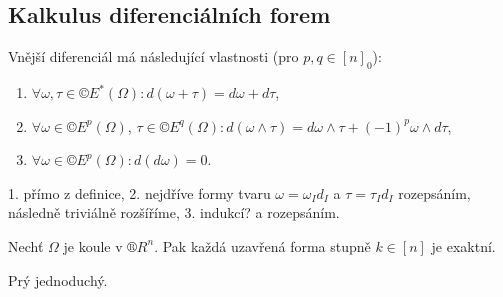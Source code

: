 \documentclass[12pt]{article}                   %
\begin{document}
    \subsection{Kalkulus diferenciálních forem}
        \begin{veta}
            Vnější diferenciál má následující vlastnosti (pro $p, q \in [n]_0$):
            
            \begin{enumerate}
                \item $\forall \omega, \tau \in ©E^*(\Omega): d(\omega + \tau) = d\omega + d\tau$,
                \item $\forall \omega \in ©E^p(\Omega)$, $\tau \in ©E^q(\Omega): d(\omega \wedge \tau) = d\omega \wedge \tau + (-1)^p \omega \wedge d\tau$,
                \item $\forall \omega \in ©E^p(\Omega): d(d\omega) = 0$.
            \end{enumerate}

            \begin{dukazin}
                1. přímo z definice, 2. nejdříve formy tvaru $\omega = \omega_Id_I$ a $\tau = \tau_Id_I$ rozepsáním, následně triviálně rozšíříme, 3. indukcí? a rozepsáním.
            \end{dukazin}
        \end{veta}

        \begin{lemma}[Poincaré]
            Nechť $\Omega$ je koule v $®R^n$. Pak každá uzavřená forma stupně $k \in [n]$ je exaktní.

            \begin{dukazin}
                Prý jednoduchý.
            \end{dukazin}
        \end{lemma}
\end{document}
